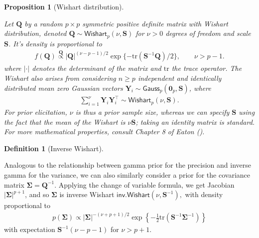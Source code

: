\documentclass[
  11pt,
  letterpaper,
]{scrbook}
\theoremstyle{definition}
\theoremstyle{definition}
\theoremstyle{definition}
\newtheorem{definition}{Definition}[chapter]
\theoremstyle{plain}
\newtheorem{proposition}{Proposition}[chapter]
\theoremstyle{plain}
\theoremstyle{plain}
\theoremstyle{remark}
\begin{document}
\begin{proposition}[Wishart
distribution]\protect\hypertarget{prp-Wishart-distribution}{}\label{prp-Wishart-distribution}

Let \(\boldsymbol{Q}\) by a random \(p \times p\) symmetric positive
definite matrix with Wishart distribution, denoted
\(\mathbf{Q} \sim \mathsf{Wishart}_p(\nu, \mathbf{S})\) for \(\nu>0\)
degrees of freedom and scale \(\mathbf{S}\). It's density is
proportional to \begin{align*}
 f(\boldsymbol{Q}) \stackrel{\boldsymbol{Q}}{\propto} |\boldsymbol{Q}|^{(\nu-p-1)/2}\exp\{-\mathrm{tr}(\mathbf{S}^{-1}\boldsymbol{Q})/2\}, \qquad \nu > p-1.
\end{align*} where \(|\cdot|\) denotes the determinant of the matrix and
\(\mathrm{tr}\) the trace operator. The Wishart also arises from
considering \(n \geq p\) independent and identically distributed mean
zero Gaussian vectors
\(\boldsymbol{Y}_i \sim \mathsf{Gauss}_p(\boldsymbol{0}_p, \mathbf{S})\),
where \begin{align*}
 \sum_{i=1}^{\nu} \boldsymbol{Y}_i\boldsymbol{Y}_i^\top \sim \mathsf{Wishart}_p(\nu, \mathbf{S}).
\end{align*} For prior elicitation, \(\nu\) is thus a prior sample size,
whereas we can specify \(\mathbf{S}\) using the fact that the mean of
the Wishart is \(\nu \mathbf{S}\); taking an identity matrix is
standard. For more mathematical properties, consult Chapter 8 of Eaton
().

\end{proposition}

\begin{definition}[Inverse
Wishart]\protect\hypertarget{def-inverse-wishart}{}\label{def-inverse-wishart}

Analogous to the relationship between gamma prior for the precision and
inverse gamma for the variance, we can also similarly consider a prior
for the covariance matrix \(\boldsymbol{\Sigma} = \boldsymbol{Q}^{-1}\).
Applying the change of variable formula, we get Jacobian
\(|\boldsymbol{\Sigma}|^{p+1}\), and so \(\boldsymbol{\Sigma}\) is
inverse Wishart \(\mathsf{inv. Wishart}(\nu, \mathbf{S}^{-1}),\) with
density proportional to \begin{align*}
 p(\boldsymbol{\Sigma}) \propto |\boldsymbol{\Sigma}|^{-(\nu+p+1)/2} \exp\left\{-\frac{1}{2} \mathrm{tr}\left(\boldsymbol{S}^{-1}\boldsymbol{\Sigma}^{-1}\right)\right\}
\end{align*} with expectation \(\mathbf{S}^{-1}(\nu-p-1)\) for
\(\nu > p+1.\)

\end{definition}
\end{document}
